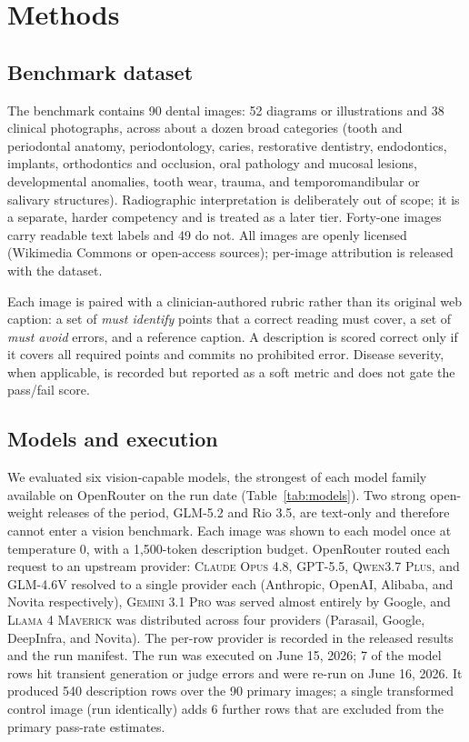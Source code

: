 \documentclass[11pt]{article}
\newcommand{\model}[1]{\textsc{#1}}
\begin{document}
\section{Methods}

\subsection{Benchmark dataset}

The benchmark contains 90 dental images: 52 diagrams or illustrations and 38 clinical photographs, across about a dozen broad categories (tooth and periodontal anatomy, periodontology, caries, restorative dentistry, endodontics, implants, orthodontics and occlusion, oral pathology and mucosal lesions, developmental anomalies, tooth wear, trauma, and temporomandibular or salivary structures). Radiographic interpretation is deliberately out of scope; it is a separate, harder competency and is treated as a later tier. Forty-one images carry readable text labels and 49 do not. All images are openly licensed (Wikimedia Commons or open-access sources); per-image attribution is released with the dataset.

Each image is paired with a clinician-authored rubric rather than its original web caption: a set of \emph{must identify} points that a correct reading must cover, a set of \emph{must avoid} errors, and a reference caption. A description is scored correct only if it covers all required points and commits no prohibited error. Disease severity, when applicable, is recorded but reported as a soft metric and does not gate the pass/fail score.

\subsection{Models and execution}

We evaluated six vision-capable models, the strongest of each model family available on OpenRouter on the run date (Table~\ref{tab:models}). Two strong open-weight releases of the period, GLM-5.2 and Rio 3.5, are text-only and therefore cannot enter a vision benchmark. Each image was shown to each model once at temperature 0, with a 1{,}500-token description budget. OpenRouter routed each request to an upstream provider: \model{Claude Opus 4.8}, \model{GPT-5.5}, \model{Qwen3.7 Plus}, and \model{GLM-4.6V} resolved to a single provider each (Anthropic, OpenAI, Alibaba, and Novita respectively), \model{Gemini 3.1 Pro} was served almost entirely by Google, and \model{Llama 4 Maverick} was distributed across four providers (Parasail, Google, DeepInfra, and Novita). The per-row provider is recorded in the released results and the run manifest. The run was executed on June 15, 2026; 7 of the model rows hit transient generation or judge errors and were re-run on June 16, 2026. It produced 540 description rows over the 90 primary images; a single transformed control image (run identically) adds 6 further rows that are excluded from the primary pass-rate estimates.
\end{document}
